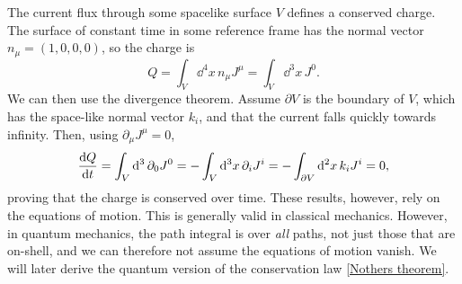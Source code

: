 The current flux through some spacelike surface $V$ defines a conserved charge. The surface of constant time in some reference frame has the normal vector $n_\mu = (1, 0, 0, 0)$, so the charge is
%
\begin{equation}
    Q = \int_V \dd^4 x \, n_\mu J^\mu = \int_V \dd^3 x \, J^0.
\end{equation}
%
We can then use the divergence theorem.
Assume $\partial V$ is the boundary of $V$, which has the space-like normal vector $k_i$, and that the current falls quickly towards infinity.
Then, using $\partial_\mu J^\mu = 0 $,
\begin{equation}
    \odv{Q}{t} 
    = \int_V \dd^3 \, \partial_0 J^0
    = - \int_V \dd^3 x \, \partial_i J^i 
    = - \int_{\partial V} \dd^2 x\, k_i J^i 
    = 0,
\end{equation}
%
proving that the charge is conserved over time.
These results, however, rely on the equations of motion.
This is generally valid in classical mechanics.
However, in quantum mechanics, the path integral is over \emph{all} paths, not just those that are on-shell, and we can therefore not assume the equations of motion vanish.
We will later derive the quantum version of the conservation law \autoref{Nothers theorem}.

